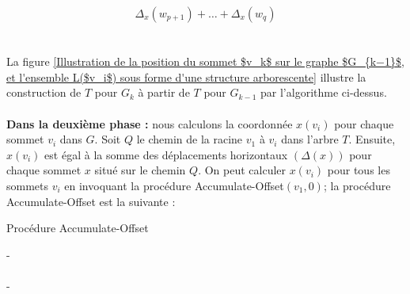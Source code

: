 \documentclass[hidelinks,letterpaper,12pt]{article}
\begin{document}
\[\Delta_x(w_{p+1}) + \dots + \Delta_x(w_{q})\]
\\ \\
La figure \ref{Illustration de la position du sommet $v_k$ sur le graphe $G_{k−1}$, et l'ensemble L($v_i$) sous forme d'une structure arborescente} illustre la construction de $T$ pour $G_k$ à partir de $T$ pour $G_{k-1}$ par l'algorithme ci-dessus.
\\ \\
\textbf{Dans la deuxième phase :} 
nous calculons la coordonnée $x(v_i)$ pour chaque sommet $v_i$ dans $G$. Soit $Q$ le chemin de la racine $v_1$ à $v_i$ dans l'arbre $T$. Ensuite, $x(v_i)$ est égal à la somme des déplacements horizontaux $(\Delta(x))$ pour chaque sommet $x$ situé sur le chemin $Q$.
On peut calculer $x(v_i)$ pour tous les sommets $v_i$ en invoquant la procédure Accumulate-Offset$(v_1, 0)$; 
la procédure Accumulate-Offset est la suivante : \\

\begin{algorithm}[H]
\label{algorithm}
\caption{Procédure Accumulate-Offset}
\end{algorithm}
\ULforem %
{\color{white}-}
\\ \\
{\color{white}-}
\end{document}
